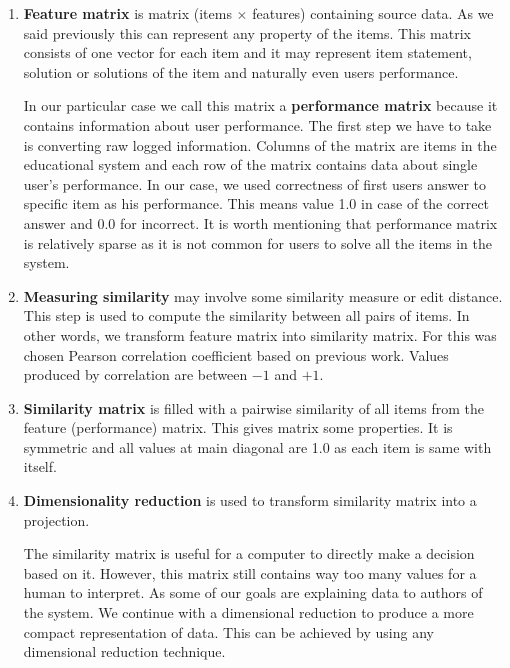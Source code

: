 \documentclass[
  digital, %
  table,   %
  nolof,     %
  nolot,     %
  nocover,
  color,
  final, %
]{fithesis3}
\begin{document}
\begin{enumerate}
  \item
    \textbf{Feature matrix} is matrix (items $\times$ features) containing source data. As we said previously this can represent any property of the items. This matrix consists of one vector for each item and it may represent item statement, solution or solutions of the item and naturally even users performance.

    In our particular case we call this matrix a \textbf{performance matrix} because it contains information about user performance. The first step we have to take is converting raw logged information. Columns of the matrix are items in the educational system and each row of the matrix contains data about single user's performance. In our case, we used correctness of first users answer to specific item as his performance. This means value 1.0 in case of the correct answer and 0.0 for incorrect. It is worth mentioning that performance matrix is relatively sparse as it is not common for users to solve all the items in the system.

  \item
    \textbf{Measuring similarity} may involve some similarity measure or edit distance. This step is used to compute the similarity between all pairs of items. In other words, we transform feature matrix into similarity matrix. For this was chosen Pearson correlation coefficient based on previous work. Values produced by correlation are between $-1$ and $+1$.

  \item
    \textbf{Similarity matrix} is filled with a pairwise similarity of all items from the feature (performance) matrix. This gives matrix some properties. It is symmetric and all values at main diagonal are 1.0 as each item is same with itself.

  \item
    \textbf{Dimensionality reduction} is used to transform similarity matrix into a projection.


    The similarity matrix is useful for a computer to directly make a decision based on it. However, this matrix still contains way too many values for a human to interpret. As some of our goals are explaining data to authors of the system. We continue with a dimensional reduction to produce a more compact representation of data. This can be achieved by using any dimensional reduction technique.


\end{enumerate}
\end{document}
